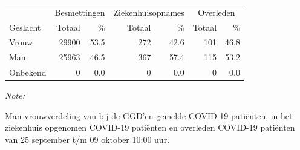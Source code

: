 \documentclass[
  english,
  man,floatsintext]{apa6}
\begin{document}
\begin{table}[H]
\centering\begingroup\fontsize{11}{13}\selectfont

\begin{threeparttable}
\begin{tabular}{lrrrrrr}
\toprule
\multicolumn{1}{c}{ } & \multicolumn{2}{c}{Besmettingen} & \multicolumn{2}{c}{Ziekenhuisopnames} & \multicolumn{2}{c}{Overleden} \\
\cmidrule(l{3pt}r{3pt}){2-3} \cmidrule(l{3pt}r{3pt}){4-5} \cmidrule(l{3pt}r{3pt}){6-7}
Geslacht & Totaal & \% & Totaal & \% & Totaal & \%\\
\midrule
Vrouw & 29900 & 53.5 & 272 & 42.6 & 101 & 46.8\\
Man & 25963 & 46.5 & 367 & 57.4 & 115 & 53.2\\
Onbekend & 0 & 0.0 & 0 & 0.0 & 0 & 0.0\\
\bottomrule
\end{tabular}
\begin{tablenotes}
\item \textit{Note: } 
\item Man-vrouwverdeling van bij de GGD’en gemelde COVID-19 patiënten, in het ziekenhuis opgenomen COVID-19 patiënten en overleden COVID-19 patiënten van 25 september t/m 09 oktober 10:00 uur.
\end{tablenotes}
\end{threeparttable}
\endgroup{}
\end{table}
\newpage
\end{document}
